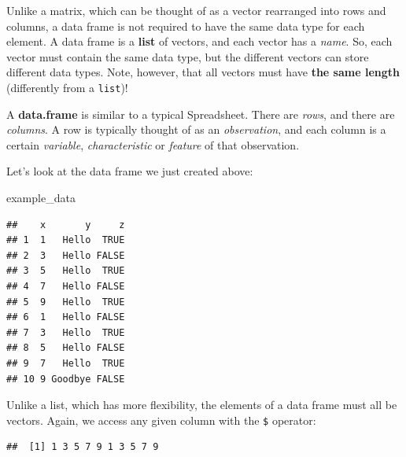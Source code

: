 \documentclass[]{book}
\newenvironment{Shaded}{\begin{snugshade}}{\end{snugshade}}
\newcommand{\KeywordTok}[1]{\textcolor[rgb]{0.13,0.29,0.53}{\textbf{#1}}}
\newcommand{\OperatorTok}[1]{\textcolor[rgb]{0.81,0.36,0.00}{\textbf{#1}}}
\newcommand{\NormalTok}[1]{#1}
\newenvironment{tip}{\begin{tcolorbox}[colback=green!5!white,colframe=green]}{\end{tcolorbox}}
\begin{document}
Unlike a matrix, which can be thought of as a vector rearranged into
rows and columns, a data frame is not required to have the same data
type for each element. A data frame is a \textbf{list} of vectors, and
each vector has a \emph{name}. So, each vector must contain the same
data type, but the different vectors can store different data types.
Note, however, that all vectors must have \textbf{the same length}
(differently from a \texttt{list})!

\begin{tip}
A \textbf{data.frame} is similar to a typical Spreadsheet. There are
\emph{rows}, and there are \emph{columns}. A row is typically thought of
as an \emph{observation}, and each column is a certain \emph{variable},
\emph{characteristic} or \emph{feature} of that observation.
\end{tip}

 Let's look at the data frame we just created above:

\begin{Shaded}
\begin{Highlighting}[]
\NormalTok{example_data}
\end{Highlighting}
\end{Shaded}

\begin{verbatim}
##    x       y     z
## 1  1   Hello  TRUE
## 2  3   Hello FALSE
## 3  5   Hello  TRUE
## 4  7   Hello FALSE
## 5  9   Hello  TRUE
## 6  1   Hello FALSE
## 7  3   Hello  TRUE
## 8  5   Hello FALSE
## 9  7   Hello  TRUE
## 10 9 Goodbye FALSE
\end{verbatim}

Unlike a list, which has more flexibility, the elements of a data frame
must all be vectors. Again, we access any given column with the
\texttt{\$} operator:

\begin{Shaded}
\end{Shaded}

\begin{verbatim}
##  [1] 1 3 5 7 9 1 3 5 7 9
\end{verbatim}

\begin{Shaded}
\end{Shaded}
\end{document}
